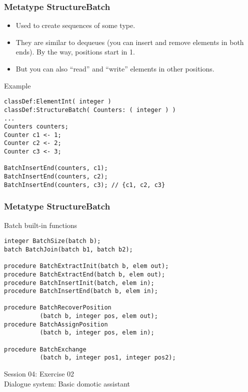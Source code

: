 \documentclass[11pt]{beamer}
\begin{document}
\begin{frame}[fragile]
\frametitle{Metatype StructureBatch}
\begin{itemize}
	\item Used to create sequences of some type.
	\item They are similar to dequeues (you can insert and remove elements in both ends). By the way, positions start in 1.
	\item But you can also ``read'' and ``write'' elements in other positions.
\end{itemize}
\begin{block}{Example}
\scriptsize
\begin{lstlisting}[language=lekta]
classDef:ElementInt( integer )
classDef:StructureBatch( Counters: ( integer ) )
...
Counters counters;
Counter c1 <- 1;
Counter c2 <- 2;
Counter c3 <- 3;

BatchInsertEnd(counters, c1);
BatchInsertEnd(counters, c2);
BatchInsertEnd(counters, c3); // {c1, c2, c3}
\end{lstlisting}
\end{block}
\end{frame}

\begin{frame}[fragile]
\frametitle{Metatype StructureBatch}
\begin{block}{Batch built-in functions}
\scriptsize
\begin{lstlisting}[language=lekta]
integer BatchSize(batch b);
batch BatchJoin(batch b1, batch b2);

procedure BatchExtractInit(batch b, elem out);
procedure BatchExtractEnd(batch b, elem out);
procedure BatchInsertInit(batch, elem in);
procedure BatchInsertEnd(batch b, elem in);

procedure BatchRecoverPosition
          (batch b, integer pos, elem out);
procedure BatchAssignPosition
          (batch b, integer pos, elem in);

procedure BatchExchange
          (batch b, integer pos1, integer pos2);
\end{lstlisting}
\end{block}
\end{frame}

\begin{frame}[fragile]
\Huge
\begin{center}
Session 04: Exercise 02\\
Dialogue system: Basic domotic assistant
\end{center}
\end{frame}
\end{document}
